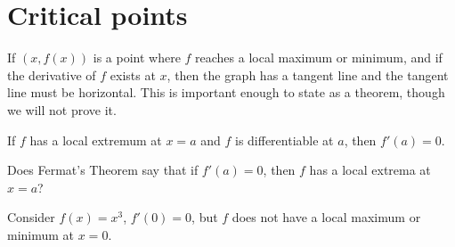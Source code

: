 \documentclass{ximera}
\begin{document}
\section{Critical points}


If $(x,f(x))$ is a point where $f$ reaches a local maximum or minimum,
and if the derivative of $f$ exists at $x$, then the graph has a
tangent line and the tangent line must be horizontal. This is
important enough to state as a theorem, though we will not prove it.

\begin{theorem}\label{theorem:fermat}
If $f$ has a local extremum at $x=a$ and $f$ is differentiable
at $a$, then $f'(a)=0$.
\end{theorem}
\begin{question}
  Does Fermat's Theorem say that if $f'(a) = 0$, then $f$ has a local
  extrema at $x=a$?
  \begin{multipleChoice}
  \end{multipleChoice}
  \begin{feedback}
    Consider $f(x) = x^3$, $f'(0) = 0$, but $f$ does not have a local
    maximum or minimum at $x=0$.
  \end{feedback}
\end{question}
\end{document}
